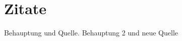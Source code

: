 
\chapter{Zitate}
Behauptung und Quelle. \cite[][]{kurose_computernetzwerke:_2014}
Behauptung 2 und neue Quelle \cite[siehe][]{guttich_intrusion-detection_2018}
